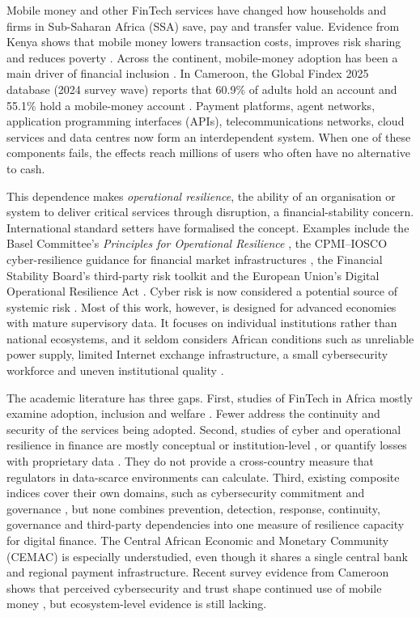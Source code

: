 \documentclass[11pt,a4paper]{article}
\begin{document}
Mobile money and other FinTech services have changed how households and firms in Sub-Saharan Africa (SSA) save, pay and transfer value. Evidence from Kenya shows that mobile money lowers transaction costs, improves risk sharing and reduces poverty \citep{Jack2014,Suri2016}. Across the continent, mobile-money adoption has been a main driver of financial inclusion \citep{Ahmad2020,Lashitew2019}. In Cameroon, the Global Findex 2025 database (2024 survey wave) reports that 60.9\% of adults hold an account and 55.1\% hold a mobile-money account \citep{WB2025Findex}. Payment platforms, agent networks, application programming interfaces (APIs), telecommunications networks, cloud services and data centres now form an interdependent system. When one of these components fails, the effects reach millions of users who often have no alternative to cash.

This dependence makes \emph{operational resilience}, the ability of an organisation or system to deliver critical services through disruption, a financial-stability concern. International standard setters have formalised the concept. Examples include the Basel Committee's \emph{Principles for Operational Resilience} \citep{BCBS2021}, the CPMI--IOSCO cyber-resilience guidance for financial market infrastructures \citep{CPMI2016}, the Financial Stability Board's third-party risk toolkit \citep{FSB2023} and the European Union's Digital Operational Resilience Act \citep[DORA;][]{EU2022DORA}. Cyber risk is now considered a potential source of systemic risk \citep{Kopp2017,Bouveret2018,Aldasoro2022}. Most of this work, however, is designed for advanced economies with mature supervisory data. It focuses on individual institutions rather than national ecosystems, and it seldom considers African conditions such as unreliable power supply, limited Internet exchange infrastructure, a small cybersecurity workforce and uneven institutional quality \citep{Kshetri2019}.

The academic literature has three gaps. First, studies of FinTech in Africa mostly examine adoption, inclusion and welfare \citep{Ozili2018,Ahmad2020,Johnen2023}. Fewer address the continuity and security of the services being adopted. Second, studies of cyber and operational resilience in finance are mostly conceptual or institution-level \citep{Dupont2019,Milkau2021,Iyer2024}, or quantify losses with proprietary data \citep{Bouveret2019}. They do not provide a cross-country measure that regulators in data-scarce environments can calculate. Third, existing composite indices cover their own domains, such as cybersecurity commitment \citep{ITU2024GCI} and governance \citep{Kaufmann2011}, but none combines prevention, detection, response, continuity, governance and third-party dependencies into one measure of resilience capacity for digital finance. The Central African Economic and Monetary Community (CEMAC) is especially understudied, even though it shares a single central bank and regional payment infrastructure. Recent survey evidence from Cameroon shows that perceived cybersecurity and trust shape continued use of mobile money \citep{Mvogo2026}, but ecosystem-level evidence is still lacking.
\end{document}
